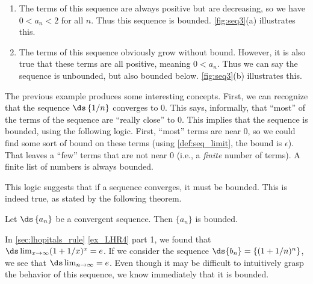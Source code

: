 {\begin{enumerate}
\item	The terms of this sequence are always positive but are decreasing, so we have $0<a_n<2$ for all $n$. Thus this sequence is bounded. \autoref{fig:seq3}(a) illustrates this.

\item	The terms of this sequence obviously grow without bound. However, it is also true that these terms are all positive, meaning $0<a_n$. Thus we can say the sequence is unbounded, but also bounded below. \autoref{fig:seq3}(b) illustrates this.\eoehere
\end{enumerate}}

The previous example produces some interesting concepts. First, we can recognize that the sequence $\ds\left\{1/n\right\}$ converges to 0. This says, informally, that ``most'' of the terms of the sequence are ``really close'' to 0. This implies that the sequence is bounded, using the following logic. First, ``most'' terms are near 0, so we could find some sort of bound on these terms (using \autoref{def:seq_limit}, the bound is $\epsilon$). That leaves a ``few'' terms that are not near 0 (i.e., a \emph{finite} number of terms). A finite list of numbers is always bounded. 

This logic suggests that if a sequence converges, it must be bounded. This is indeed true, as stated by the following theorem.

{Let $\ds \left\{a_n\right\}$ be a convergent sequence. Then $\{a_n\}$ is bounded.
}


In \autoref{sec:lhopitals_rule} \autoref{ex_LHR4} part 1, we found that $\ds \lim_{x\to \infty} (1+1/x)^x=e$. If we consider the sequence $\ds \{b_n\}=\{(1+1/n)^n\}$, we see that $\ds \lim_{n\to \infty}=e$. Even though it may be difficult to intuitively grasp the behavior of this sequence, we know immediately that it is bounded.

